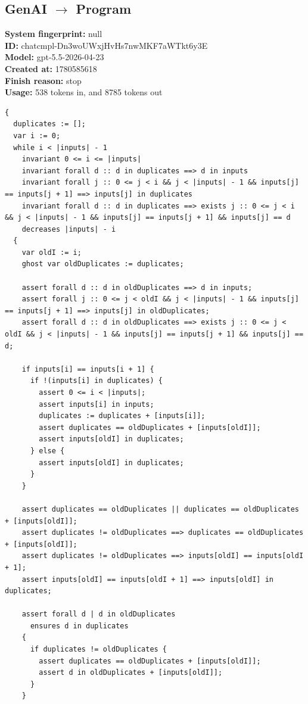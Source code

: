 \documentclass{article}
\begin{document}
\subsection*{GenAI $\rightarrow$ Program}
\textbf{System fingerprint: }null
\\\textbf{ID: }chatcmpl-Dn3woUWxjHvHs7nwMKF7aWTkt6y3E
\\\textbf{Model: }gpt-5.5-2026-04-23
\\\textbf{Created at: }1780585618
\\\textbf{Finish reason: }stop
\\\textbf{Usage: }538 tokens in, and 8785 tokens out
\begin{lstlisting}
{
  duplicates := [];
  var i := 0;
  while i < |inputs| - 1
    invariant 0 <= i <= |inputs|
    invariant forall d :: d in duplicates ==> d in inputs
    invariant forall j :: 0 <= j < i && j < |inputs| - 1 && inputs[j] == inputs[j + 1] ==> inputs[j] in duplicates
    invariant forall d :: d in duplicates ==> exists j :: 0 <= j < i && j < |inputs| - 1 && inputs[j] == inputs[j + 1] && inputs[j] == d
    decreases |inputs| - i
  {
    var oldI := i;
    ghost var oldDuplicates := duplicates;

    assert forall d :: d in oldDuplicates ==> d in inputs;
    assert forall j :: 0 <= j < oldI && j < |inputs| - 1 && inputs[j] == inputs[j + 1] ==> inputs[j] in oldDuplicates;
    assert forall d :: d in oldDuplicates ==> exists j :: 0 <= j < oldI && j < |inputs| - 1 && inputs[j] == inputs[j + 1] && inputs[j] == d;

    if inputs[i] == inputs[i + 1] {
      if !(inputs[i] in duplicates) {
        assert 0 <= i < |inputs|;
        assert inputs[i] in inputs;
        duplicates := duplicates + [inputs[i]];
        assert duplicates == oldDuplicates + [inputs[oldI]];
        assert inputs[oldI] in duplicates;
      } else {
        assert inputs[oldI] in duplicates;
      }
    }

    assert duplicates == oldDuplicates || duplicates == oldDuplicates + [inputs[oldI]];
    assert duplicates != oldDuplicates ==> duplicates == oldDuplicates + [inputs[oldI]];
    assert duplicates != oldDuplicates ==> inputs[oldI] == inputs[oldI + 1];
    assert inputs[oldI] == inputs[oldI + 1] ==> inputs[oldI] in duplicates;

    assert forall d | d in oldDuplicates
      ensures d in duplicates
    {
      if duplicates != oldDuplicates {
        assert duplicates == oldDuplicates + [inputs[oldI]];
        assert d in oldDuplicates + [inputs[oldI]];
      }
    }


\end{lstlisting}
\end{document}
